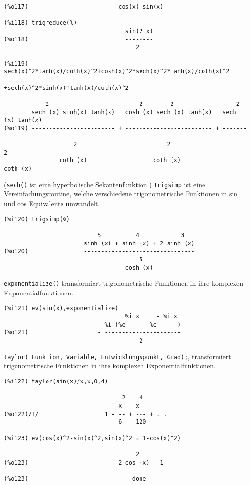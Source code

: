 \documentclass[spanish,12pt,a4paper]{article}
\begin{document}
\scriptsize
\begin{verbatim}
(%o117)                          cos(x) sin(x)

(%i118) trigreduce(%)
                                   sin(2 x)
(%o118)                            --------
                                      2

(%i119) sech(x)^2*tanh(x)/coth(x)^2+cosh(x)^2*sech(x)^2*tanh(x)/coth(x)^2
                                   +sech(x)^2*sinh(x)*tanh(x)/coth(x)^2

            2                          2        2                  2
        sech (x) sinh(x) tanh(x)   cosh (x) sech (x) tanh(x)   sech (x) tanh(x)
(%o119) ------------------------ + ------------------------- + ----------------
                    2                          2                       2
                coth (x)                   coth (x)                coth (x)
\end{verbatim}
\normalsize

(\verb|sech()| ist eine hyperbolische Sekantenfunktion.) \verb|trigsimp| ist eine Vereinfachungsroutine, welche verschiedene trigonometrische Funktionen in sin und cos Equivalente umwandelt.

\scriptsize
\begin{verbatim}
(%i120) trigsimp(%)

                           5          4            3
                       sinh (x) + sinh (x) + 2 sinh (x)
(%o120)                --------------------------------
                                       5
                                   cosh (x)
\end{verbatim}
\normalsize

\verb|exponentialize()| transformiert trigonometrische Funktionen in ihre komplexen Exponentialfunktionen.

\scriptsize
\begin{verbatim}
(%i121) ev(sin(x),exponentialize)
                                   %i x     - %i x
                             %i (%e     - %e      )
(%o121)                    - ----------------------
                                       2
\end{verbatim}
\normalsize


\verb|taylor( Funktion, Variable, Entwicklungspunkt, Grad);|, transformiert trigonometrische Funktionen in ihre komplexen Exponentialfunktionen.

\scriptsize
\begin{verbatim}
(%i122) taylor(sin(x)/x,x,0,4)

                                  2    4
                                 x    x
(%o122)/T/                   1 - -- + --- + . . .
                                 6    120

(%i123) ev(cos(x)^2-sin(x)^2,sin(x)^2 = 1-cos(x)^2)

                                      2
(%o123)                          2 cos (x) - 1

(%o123)                              done
\end{verbatim}
\normalsize
\end{document}
